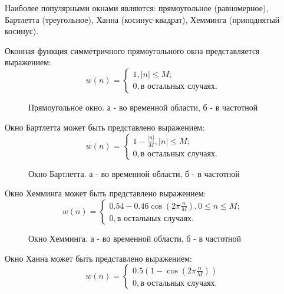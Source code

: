 Наиболее популярными окнами являются: прямоугольное (равномерное), Бартлетта (треугольное), Ханна (косинус-квадрат), Хемминга (приподнятый косинус).

Оконная функция симметричного прямоугольного окна представляется выражением:
\begin{equation}
	\label{eq:rect_window}
	 w(n) = \begin{cases}
		1, |n| \le M; \\
		0, \mbox{в остальных случаях}.
		\end{cases}
\end{equation}
\begin{figure}[h]
	\center{}
	\caption{Прямоугольное окно. а - во временной области, б - в частотной}
	\label{pic:win_rect}
\end{figure}

Окно Бартлетта может быть представлено выражением:
\begin{equation}
	\label{eq:rect_bartlett}
	 w(n) = \begin{cases}
		1 - \frac{|n|}{M}, |n| \le M; \\
		0, \mbox{в остальных случаях}.
		\end{cases}
\end{equation}
\begin{figure}[h]
	\center{}
	\caption{Окно Бартлетта. а - во временной области, б - в частотной}
	\label{pic:win_bart}
\end{figure}

Окно Хемминга может быть представлено выражением:
\begin{equation}
	\label{eq:rect_hamming}
	 w(n) = \begin{cases}
		0.54 - 0.46\cos \left( 2 \pi \frac{n}{M} \right), 0 \le n \le M; \\
		0, \mbox{в остальных случаях}.
		\end{cases}
\end{equation}
\begin{figure}[h]
	\center{}
	\caption{Окно Хемминга. а - во временной области, б - в частотной}
	\label{pic:win_hamming}
\end{figure}

Окно Ханна может быть представлено выражением:
\begin{equation}
	\label{eq:rect_hann}
	 w(n) = \begin{cases}
		0.5 \left( 1 - \cos\left( 2 \pi \frac{n}{M} \right) \right) \\
		0, \mbox{в остальных случаях}.
		\end{cases}
\end{equation}

